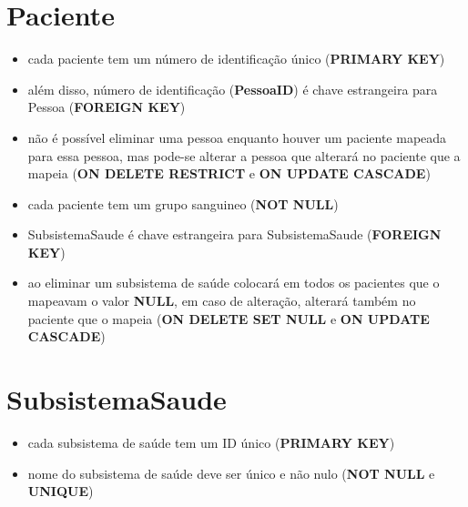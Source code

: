 \documentclass[article, a4paper, 12pt, oneside]{memoir}
\begin{document}
\section*{Paciente}
\begin{itemize}
	\item cada paciente tem um número de identificação único (\textbf{PRIMARY KEY})
	\item além disso, número de identificação (\textbf{PessoaID}) é chave estrangeira para Pessoa (\textbf{FOREIGN KEY})
	\item não é possível eliminar uma pessoa enquanto houver um paciente mapeada para essa pessoa, mas pode-se alterar a pessoa que alterará no paciente que a mapeia (\textbf{ON DELETE RESTRICT} e \textbf{ON UPDATE CASCADE})
	\item cada paciente tem um grupo sanguineo (\textbf{NOT NULL})
	\item SubsistemaSaude é chave estrangeira para SubsistemaSaude (\textbf{FOREIGN KEY})
	\item ao eliminar um subsistema de saúde colocará em todos os pacientes que o mapeavam o valor \textbf{NULL}, em caso de alteração, alterará também no paciente que o mapeia (\textbf{ON DELETE SET NULL} e \textbf{ON UPDATE CASCADE})
\end{itemize}

\section*{SubsistemaSaude}
\begin{itemize}
	\item cada subsistema de saúde tem um ID único (\textbf{PRIMARY KEY})
	\item nome do subsistema de saúde deve ser único e não nulo (\textbf{NOT NULL} e \textbf{UNIQUE})
\end{itemize}
\end{document}
